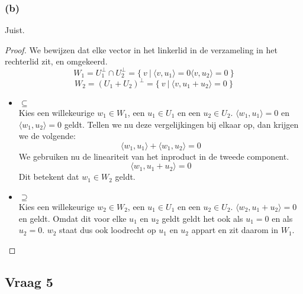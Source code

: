 \documentclass[lineaire_algebra_oplossingen.tex]{subfiles}
\begin{document}
\subsubsection*{(b)}
Juist.
\begin{proof}
We bewijzen dat elke vector in het linkerlid in de verzameling in het rechterlid zit, en omgekeerd.
\[
W_1 = U_1^\bot \cap U_2^\bot = \{\ v\ |\ \langle v,u_1\rangle = 0 \langle v,u_2\rangle = 0\ \}
\]
\[
W_2 = (U_1+U_2)^\bot = \{\ v\ |\ \langle v, u_1+u_2\rangle = 0\ \}
\]
\begin{itemize}
\item $\subseteq$\\
Kies een willekeurige $w_1 \in W_1$, een $u_1 \in U_1$ en een $u_2 \in U_2$. $\langle w_1,u_1\rangle = 0$ en $\langle w_1,u_2\rangle = 0$ geldt. Tellen we nu deze vergelijkingen bij elkaar op, dan krijgen we de volgende:
\[
\langle w_1,u_1\rangle + \langle w_1,u_2\rangle = 0
\]
We gebruiken nu de lineariteit van het inproduct in de tweede component.
\[
\langle w_1,u_1+u_2\rangle = 0
\]
Dit betekent dat $w_1 \in W_2$ geldt.

\item $\supseteq$\\
Kies een willekeurige $w_2 \in W_2$, een $u_1 \in U_1$ en een $u_2 \in U_2$. $\langle w_2,u_1+u_2\rangle = 0$ en geldt.
Omdat dit voor elke $u_1$ en $u_2$ geldt geldt het ook als $u_1=0$ en als $u_2=0$. $w_2$ staat dus ook loodrecht op $u_1$ en $u_2$ appart en zit daarom in $W_1$.
\end{itemize}
\end{proof}

\subsection{Vraag 5}
\end{document}
